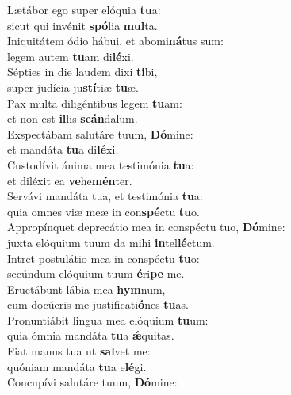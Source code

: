 \evenverse Lætábor ego super elóquia \textbf{tu}a:~\*\\
\evenverse sicut qui invénit \textbf{spó}lia \textbf{mul}ta.\\
\oddverse Iniquitátem ódio hábui, et abomi\textbf{ná}tus sum:~\*\\
\oddverse legem autem \textbf{tu}am di\textbf{lé}xi.\\
\evenverse Sépties in die laudem dixi \textbf{ti}bi,~\*\\
\evenverse super judícia ju\textbf{stí}tiæ \textbf{tu}æ.\\
\oddverse Pax multa diligéntibus legem \textbf{tu}am:~\*\\
\oddverse et non est \textbf{il}lis \textbf{scán}dalum.\\
\evenverse Exspectábam salutáre tuum, \textbf{Dó}mine:~\*\\
\evenverse et mandáta \textbf{tu}a di\textbf{lé}xi.\\
\oddverse Custodívit ánima mea testimónia \textbf{tu}a:~\*\\
\oddverse et diléxit ea \textbf{ve}he\textbf{mén}ter.\\
\evenverse Servávi mandáta tua, et testimónia \textbf{tu}a:~\*\\
\evenverse quia omnes viæ meæ in con\textbf{spé}ctu \textbf{tu}o.\\
\oddverse Appropínquet deprecátio mea in conspéctu tuo, \textbf{Dó}mine:~\*\\
\oddverse juxta elóquium tuum da mihi \textbf{in}tel\textbf{lé}ctum.\\
\evenverse Intret postulátio mea in conspéctu \textbf{tu}o:~\*\\
\evenverse secúndum elóquium tuum \textbf{é}ri\textbf{pe} me.\\
\oddverse Eructábunt lábia mea \textbf{hym}num,~\*\\
\oddverse cum docúeris me justificati\textbf{ó}nes \textbf{tu}as.\\
\evenverse Pronuntiábit lingua mea elóquium \textbf{tu}um:~\*\\
\evenverse quia ómnia mandáta \textbf{tu}a \textbf{ǽ}quitas.\\
\oddverse Fiat manus tua ut \textbf{sal}vet me:~\*\\
\oddverse quóniam mandáta \textbf{tu}a e\textbf{lé}gi.\\
\evenverse Concupívi salutáre tuum, \textbf{Dó}mine:~\*\\

